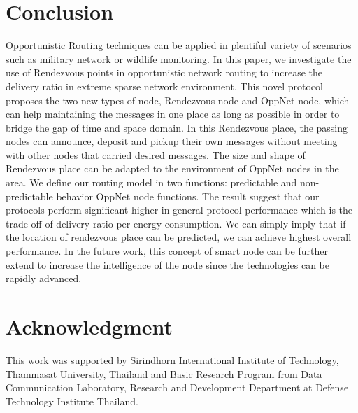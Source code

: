 \documentclass[conference]{IEEEtran}
\begin{document}
\section{Conclusion}
Opportunistic Routing techniques can be applied in  plentiful variety of scenarios such as military network or wildlife monitoring. 
%
In this paper, we investigate the use of Rendezvous points in opportunistic network routing to increase the delivery ratio in extreme sparse network environment.
%
This novel protocol proposes the two new types of node, Rendezvous node and OppNet node, which can help maintaining the messages in one place as long as possible in order to bridge the gap of time and space domain.
%
In this Rendezvous place, the passing nodes can announce, deposit and pickup their own messages without meeting with other nodes that carried desired messages.
%
The size and shape of  Rendezvous place can be adapted to the environment of OppNet nodes in the area.
%
We define our routing model in two functions: predictable  and non-predictable behavior OppNet node functions.
%
The result suggest that our protocols perform significant higher in general protocol performance which is the trade off of delivery ratio per energy consumption.
%
We can simply imply that if the location of rendezvous place can be predicted, we can achieve highest overall performance.
In the future work, this concept of smart node can be further extend to increase the intelligence of the node since the technologies can be rapidly advanced.


\section*{Acknowledgment}
This work was supported by Sirindhorn International Institute of Technology, Thammasat University, Thailand and Basic Research Program from Data Communication Laboratory, Research and Development Department at Defense Technology Institute Thailand.



\end{document}
